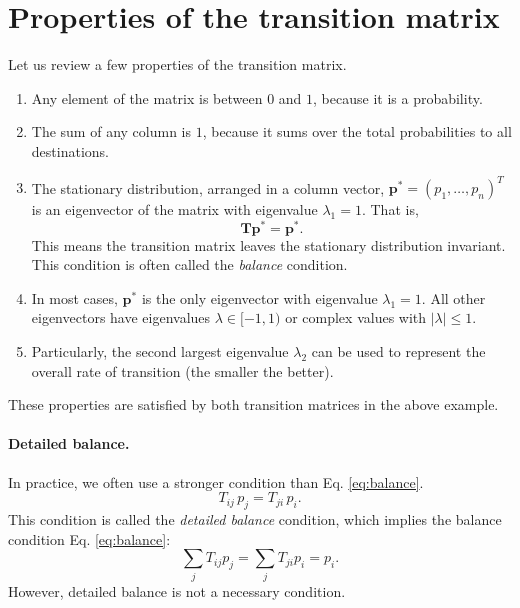 \documentclass[12pt]{article}
\begin{document}
\section{Properties of the transition matrix}

Let us review a few properties of the transition matrix.
%
\begin{enumerate}
  \item Any element of the matrix is between $0$ and $1$,
    because it is a probability.
  \item The sum of any column is $1$, because it
    sums over the total probabilities to all destinations.
  \item The stationary distribution, arranged in a column vector,
      $\mathbf p^* = (p_1, \dots, p_n)^T$ is an eigenvector of the matrix
      with eigenvalue $\lambda_1 = 1$. That is,
      \begin{equation}
        \mathbf T \mathbf p^* = \mathbf p^*.
        \label{eq:balance}
      \end{equation}
      This means the transition matrix leaves
      the stationary distribution invariant.
      This condition is often called the \emph{balance} condition.
  \item
      In most cases, $\mathbf p^*$ is the only eigenvector
      with eigenvalue $\lambda_1 = 1$.
      All other eigenvectors have eigenvalues $\lambda \in [-1, 1)$
        or complex values with $|\lambda| \le 1$.
  \item
      Particularly, the second largest eigenvalue $\lambda_2$ can be used to represent
      the overall rate of transition (the smaller the better).
\end{enumerate}
%
These properties are satisfied by both transition matrices
in the above example.

\paragraph*{Detailed balance.}

In practice, we often use a stronger condition than Eq. \eqref{eq:balance}.
\begin{equation}
  T_{ij} \, p_j = T_{ji} \, p_i.
  \label{eq:detailedbalance}
\end{equation}
This condition is called the \emph{detailed balance} condition,
which implies the balance condition Eq. \eqref{eq:balance}:
$$
\sum_j T_{ij} p_j = \sum_j T_{ji} p_i = p_i.
$$
However, detailed balance is not a necessary condition.
\end{document}
